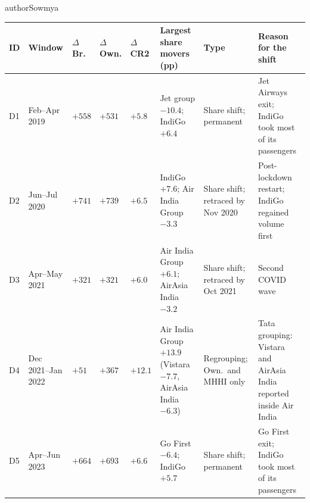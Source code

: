 \begin{mergedcontribution}{authorSowmya}
\begin{minipage}{\linewidth}
\label{tab:o1-drift}
\centering
{\footnotesize{}\setlength{\tabcolsep}{3pt}
\fontsize{9}{10.8}\selectfont{}\setlength{\tabcolsep}{3pt}
\renewcommand{\arraystretch}{1.15}
\begin{tabular}{|>{\raggedright\arraybackslash}p{}|>{\raggedright\arraybackslash}p{}|>{\raggedright\arraybackslash}p{}|>{\raggedright\arraybackslash}p{}|>{\raggedright\arraybackslash}p{}|>{\raggedright\arraybackslash}p{}|>{\raggedright\arraybackslash}p{}|>{\raggedright\arraybackslash}p{}|}
\hline
\textbf{ID} & \textbf{Window} & \textbf{$\Delta$Br.} & \textbf{$\Delta$Own.} & \textbf{$\Delta$CR2} & \textbf{Largest share movers (pp)} & \textbf{Type} & \textbf{Reason for the shift} \\
\hline
D1 & Feb--Apr 2019 & $+558$ & $+531$ & $+5.8$ & Jet group $-10.4$; IndiGo $+6.4$ & Share shift; permanent & Jet Airways exit; IndiGo took most of its passengers \\
\hline
D2 & Jun--Jul 2020 & $+741$ & $+739$ & $+6.5$ & IndiGo $+7.6$; Air India Group $-3.3$ & Share shift; retraced by Nov 2020 & Post-lockdown restart; IndiGo regained volume first \\
\hline
D3 & Apr--May 2021 & $+321$ & $+321$ & $+6.0$ & Air India Group $+6.1$; AirAsia India $-3.2$ & Share shift; retraced by Oct 2021 & Second COVID wave \\
\hline
D4 & Dec 2021--Jan 2022 & $+51$ & $+367$ & $+12.1$ & Air India Group $+13.9$ (Vistara $-7.7$, AirAsia India $-6.3$) & Regrouping; Own.\ and MHHI only & Tata grouping: Vistara and AirAsia India reported inside Air India \\
\hline
D5 & Apr--Jun 2023 & $+664$ & $+693$ & $+6.6$ & Go First $-6.4$; IndiGo $+5.7$ & Share shift; permanent & Go First exit; IndiGo took most of its passengers \\

\end{tabular}}
\end{minipage}
\end{mergedcontribution}
